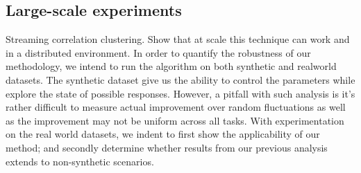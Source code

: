 \subsection{Large-scale experiments}
Streaming correlation clustering. Show that at scale this technique can work and in a distributed environment.
In order to quantify the robustness of our methodology, we intend to run the algorithm on both synthetic and realworld datasets.
The synthetic dataset give us the ability to control the parameters while explore the state of possible responses.
However, a pitfall with such analysis is it's rather difficult to measure actual improvement over random fluctuations as well as the improvement may not be uniform across all tasks.
With experimentation on the real world datasets, we indent to first show the applicability of our method; and secondly determine whether results from our previous analysis extends to non-synthetic scenarios.


